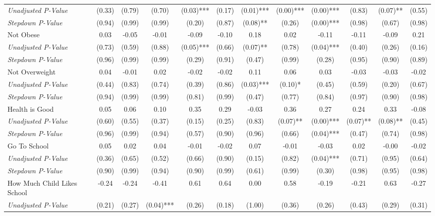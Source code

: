 \begin{tabular}{l c c c c c c c c c c c}
\quad \textit{Unadjusted P-Value} & (0.33) & (0.79) & (0.70) & (0.03)*** & (0.17) & (0.01)*** & (0.00)*** & (0.00)*** & (0.83) & (0.07)** & (0.55) \\
\quad \textit{Stepdown P-Value} & (0.94) & (0.99) & (0.99) & (0.20) & (0.87) & (0.08)** & (0.26) & (0.00)*** & (0.98) & (0.67) & (0.98) \\
Not Obese & 0.03 & -0.05 & -0.01 & -0.09 & -0.10 & 0.18 & 0.02 & -0.11 & -0.11 & -0.09 & 0.21 \\
\quad \textit{Unadjusted P-Value} & (0.73) & (0.59) & (0.88) & (0.05)*** & (0.66) & (0.07)** & (0.78) & (0.04)*** & (0.40) & (0.26) & (0.16) \\
\quad \textit{Stepdown P-Value} & (0.96) & (0.99) & (0.99) & (0.29) & (0.91) & (0.47) & (0.99) & (0.28) & (0.95) & (0.90) & (0.89) \\
Not Overweight & 0.04 & -0.01 & 0.02 & -0.02 & -0.02 & 0.11 & 0.06 & 0.03 & -0.03 & -0.03 & -0.02 \\
\quad \textit{Unadjusted P-Value} & (0.44) & (0.83) & (0.74) & (0.39) & (0.86) & (0.03)*** & (0.10)* & (0.45) & (0.59) & (0.20) & (0.67) \\
\quad \textit{Stepdown P-Value} & (0.94) & (0.99) & (0.99) & (0.81) & (0.99) & (0.47) & (0.77) & (0.84) & (0.97) & (0.90) & (0.98) \\
Health is Good & 0.05 & 0.06 & 0.10 & 0.35 & 0.29 & -0.03 & 0.36 & 0.27 & 0.24 & 0.33 & -0.08 \\
\quad \textit{Unadjusted P-Value} & (0.60) & (0.55) & (0.37) & (0.15) & (0.25) & (0.83) & (0.07)** & (0.00)*** & (0.07)** & (0.08)** & (0.45) \\
\quad \textit{Stepdown P-Value} & (0.96) & (0.99) & (0.94) & (0.57) & (0.90) & (0.96) & (0.66) & (0.04)*** & (0.47) & (0.74) & (0.98) \\
Go To School & 0.05 & 0.02 & 0.04 & -0.01 & -0.02 & 0.07 & -0.01 & -0.03 & 0.02 & -0.00 & -0.02 \\
\quad \textit{Unadjusted P-Value} & (0.36) & (0.65) & (0.52) & (0.66) & (0.90) & (0.15) & (0.82) & (0.04)*** & (0.71) & (0.95) & (0.64) \\
\quad \textit{Stepdown P-Value} & (0.90) & (0.99) & (0.94) & (0.90) & (0.99) & (0.61) & (0.99) & (0.30) & (0.98) & (0.95) & (0.98) \\
How Much Child Likes School & -0.24 & -0.24 & -0.41 & 0.61 & 0.64 & 0.00 & 0.58 & -0.19 & -0.21 & 0.63 & -0.27 \\
\quad \textit{Unadjusted P-Value} & (0.21) & (0.27) & (0.04)*** & (0.26) & (0.18) & (1.00) & (0.36) & (0.26) & (0.43) & (0.29) & (0.31) \\

\end{tabular}
